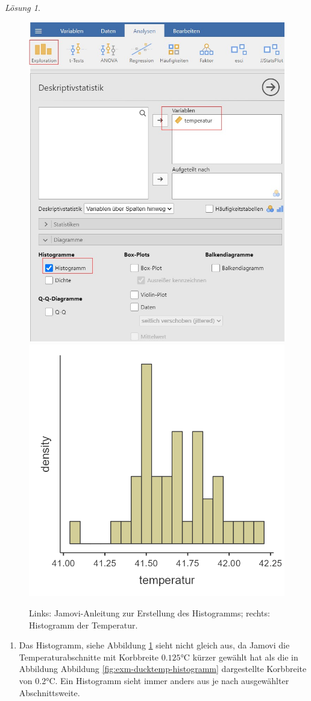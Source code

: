 \documentclass[
]{book}
\providecommand{\tightlist}{%
  \setlength{\itemsep}{0pt}\setlength{\parskip}{0pt}}
\theoremstyle{definition}
\theoremstyle{definition}
\theoremstyle{definition}
\theoremstyle{definition}
\theoremstyle{remark}
\newtheorem*{solution}{Lösung}
\begin{document}
\begin{solution}
\leavevmode

\begin{figure}
  \includegraphics[width=0.5\linewidth]{figures/Enten_n40_instr_histogramm} \includegraphics[width=0.5\linewidth]{figures/Enten_n40} \caption{Links: Jamovi-Anleitung zur Erstellung des Histogramms; rechts: Histogramm der Temperatur.}\label{fig:enten-hist-mean-sd1}
  \end{figure}

\begin{enumerate}
\def\labelenumi{(\alph{enumi})}
\tightlist
\item
  Das Histogramm, siehe Abbildung \ref{fig:enten-hist-mean-sd1} sieht nicht gleich aus, da Jamovi die Temperaturabschnitte mit Korbbreite \(0.125\)°C kürzer gewählt hat als die in Abbildung Abbildung \ref{fig:exm-ducktemp-histogramm} dargestellte Korbbreite von \(0.2\)°C. Ein Histogramm sieht immer anders aus je nach ausgewählter Abschnittsweite.
\end{enumerate}


\end{solution}
\end{document}
